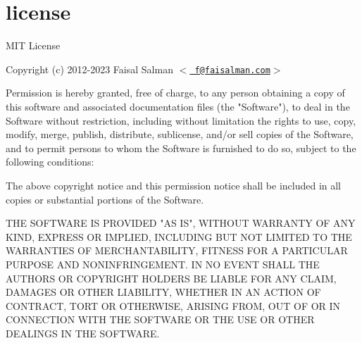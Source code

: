 \chapter{license}
\hypertarget{md__d_1_2_g_i_t_2_food_link_2foodlink_8client_2node__modules_2ua-parser-js_2license}{}\label{md__d_1_2_g_i_t_2_food_link_2foodlink_8client_2node__modules_2ua-parser-js_2license}
MIT License

Copyright (c) 2012-\/2023 Faisal Salman \texorpdfstring{$<$}{<}\href{mailto:f@faisalman.com}{\texttt{ f@faisalman.\+com}}\texorpdfstring{$>$}{>}

Permission is hereby granted, free of charge, to any person obtaining a copy of this software and associated documentation files (the "{}\+Software"{}), to deal in the Software without restriction, including without limitation the rights to use, copy, modify, merge, publish, distribute, sublicense, and/or sell copies of the Software, and to permit persons to whom the Software is furnished to do so, subject to the following conditions\+:

The above copyright notice and this permission notice shall be included in all copies or substantial portions of the Software.

THE SOFTWARE IS PROVIDED "{}\+AS IS"{}, WITHOUT WARRANTY OF ANY KIND, EXPRESS OR IMPLIED, INCLUDING BUT NOT LIMITED TO THE WARRANTIES OF MERCHANTABILITY, FITNESS FOR A PARTICULAR PURPOSE AND NONINFRINGEMENT. IN NO EVENT SHALL THE AUTHORS OR COPYRIGHT HOLDERS BE LIABLE FOR ANY CLAIM, DAMAGES OR OTHER LIABILITY, WHETHER IN AN ACTION OF CONTRACT, TORT OR OTHERWISE, ARISING FROM, OUT OF OR IN CONNECTION WITH THE SOFTWARE OR THE USE OR OTHER DEALINGS IN THE SOFTWARE. 